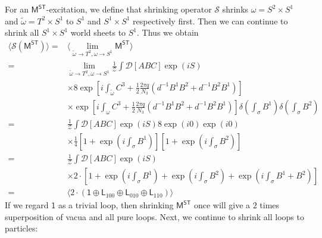 \documentclass[11pt,nofootinbib,preprint]{revtex4-1}
\begin{document}
 For an $\mathsf{M^{ST}}$-excitation, we define that shrinking operator $\mathcal{S}$ shrinks $\omega=S^2\times S^1$ and $\tilde{\omega}=T^2\times S^1$ to $S^1$ and $S^1\times S^1$ respectively first. Then we can continue to shrink all $S^1\times S^1$ world sheets to $S^1$. Thus we obtain 
\begin{align}
	\langle \mathcal{S} \left( \mathsf{M^{ST}} \right) \rangle =&\langle \underset{\tilde{\omega}\rightarrow T^2,\omega \rightarrow S^1}{\lim}\mathsf{M^{ST}} \rangle \nonumber
	\\
	=&\underset{\tilde{\omega}\rightarrow T^2,\omega \rightarrow S^1}{\lim}\frac{1}{\mathcal{Z}}\int{\mathcal{D} \left[ ABC \right] \exp \left( iS \right)} \nonumber
	\\
	&\times 8\exp \left[ i\int_{\tilde{\omega}}{C^3+\frac{1}{2}\frac{2\pi q}{N_3}\left( d^{-1}B^1B^2+d^{-1}B^2B^1 \right)} \right] \nonumber
	\\
	&\times \exp \left[ i\int_{\omega}{C^3+\frac{1}{2}\frac{2\pi q}{N_3}\left( d^{-1}B^1B^2+d^{-1}B^2B^1 \right)} \right] \delta \left( \int_{\sigma}{B^1} \right) \delta \left( \int_{\sigma}{B^2} \right) \nonumber
	\\
	=&\frac{1}{\mathcal{Z}}\int{\mathcal{D} \left[ ABC\right] \exp \left( iS \right) 8\exp \left( i0 \right)}\exp \left( i0 \right) \nonumber
	\\
	&\times \frac{1}{4}\left[ 1+\exp \left( i\int_{\sigma}{B^1} \right) \right] \left[ 1+\exp \left( i\int_{\sigma}{B^2} \right) \right] \nonumber
	\\
	=&\frac{1}{\mathcal{Z}}\int{\mathcal{D} \left[ ABC \right] \exp \left( iS \right)} \nonumber
	\\
	&\times 2\cdot\left[ 1+\exp \left( i\int_{\sigma}{B^1} \right) +\exp \left( i\int_{\sigma}{B^2} \right) +\exp \left( i\int_{\sigma}{B^1+B^2} \right) \right] \nonumber
	\\
	=&\langle 2\cdot\left(\mathsf{1}\oplus \mathsf{L}_{100}\oplus \mathsf{L}_{010}\oplus \mathsf{L}_{110}\right) \rangle 
\end{align}
If we regard $\mathsf{1}$ as a trivial loop, then shrinking $\mathsf{M^{ST}}$ once will give a $2$ times superposition of vacua and all pure loops.  Next, we continue to shrink all loops to particles:  
\end{document}
